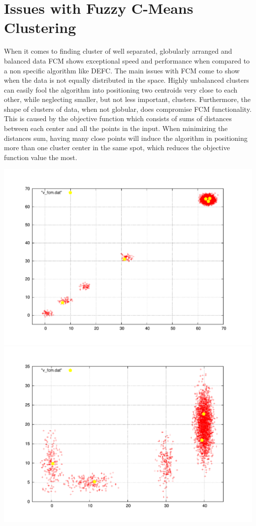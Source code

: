 \documentclass[a4paper]{article}
\begin{document}
\section{Issues with Fuzzy C-Means Clustering}
When it comes to finding cluster of well separated, globularly arranged and balanced data FCM shows exceptional speed and performance when compared to a non specific algorithm like DEFC. The main issues with FCM come to show when the data is not equally distributed in the space.
Highly unbalanced clusters can easily fool the algorithm into positioning two centroids very close to each other, while neglecting smaller, but not less important, clusters. Furthermore, the shape of clusters of data, when not globular, does compromise FCM functionality.\\
This is caused by the objective function which consists of sums of distances between each center and all the points in the input. When minimizing the distances sum, having many close points will induce the algorithm in positioning more than one cluster center in the same spot, which reduces the objective function value the most.
\vspace{-10pt}
\begin{center}
\includegraphics[scale=0.30]{gauss1FCM.pdf}
\includegraphics[scale=0.30]{gauss4FCM.pdf}
\end{center}
\end{document}

